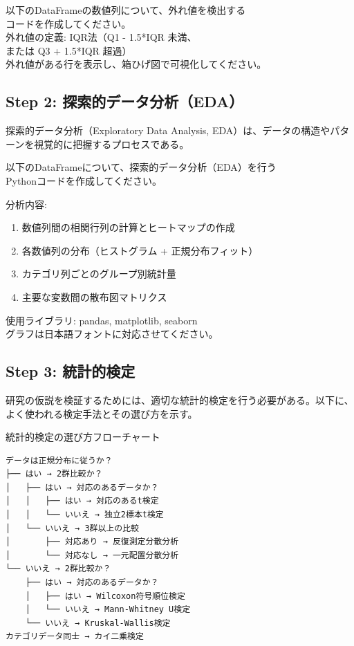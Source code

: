 \begin{promptbox}
以下のDataFrameの数値列について、外れ値を検出する\\
コードを作成してください。\\
外れ値の定義: IQR法（Q1 - 1.5*IQR 未満、\\
または Q3 + 1.5*IQR 超過）\\
外れ値がある行を表示し、箱ひげ図で可視化してください。
\end{promptbox}

\subsection{Step 2: 探索的データ分析（EDA）}

探索的データ分析（Exploratory Data Analysis, EDA）は、データの構造やパターンを視覚的に把握するプロセスである。

\begin{promptbox}
以下のDataFrameについて、探索的データ分析（EDA）を行う\\
Pythonコードを作成してください。

分析内容:
\begin{enumerate}
\item 数値列間の相関行列の計算とヒートマップの作成
\item 各数値列の分布（ヒストグラム + 正規分布フィット）
\item カテゴリ列ごとのグループ別統計量
\item 主要な変数間の散布図マトリクス
\end{enumerate}

使用ライブラリ: pandas, matplotlib, seaborn\\
グラフは日本語フォントに対応させてください。
\end{promptbox}

\subsection{Step 3: 統計的検定}

研究の仮説を検証するためには、適切な統計的検定を行う必要がある。以下に、よく使われる検定手法とその選び方を示す。

\begin{itembox}[l]{統計的検定の選び方フローチャート}
\begin{verbatim}
データは正規分布に従うか？
├── はい → 2群比較か？
│   ├── はい → 対応のあるデータか？
│   │   ├── はい → 対応のあるt検定
│   │   └── いいえ → 独立2標本t検定
│   └── いいえ → 3群以上の比較
│       ├── 対応あり → 反復測定分散分析
│       └── 対応なし → 一元配置分散分析
└── いいえ → 2群比較か？
    ├── はい → 対応のあるデータか？
    │   ├── はい → Wilcoxon符号順位検定
    │   └── いいえ → Mann-Whitney U検定
    └── いいえ → Kruskal-Wallis検定
カテゴリデータ同士 → カイ二乗検定
\end{verbatim}
\end{itembox}

